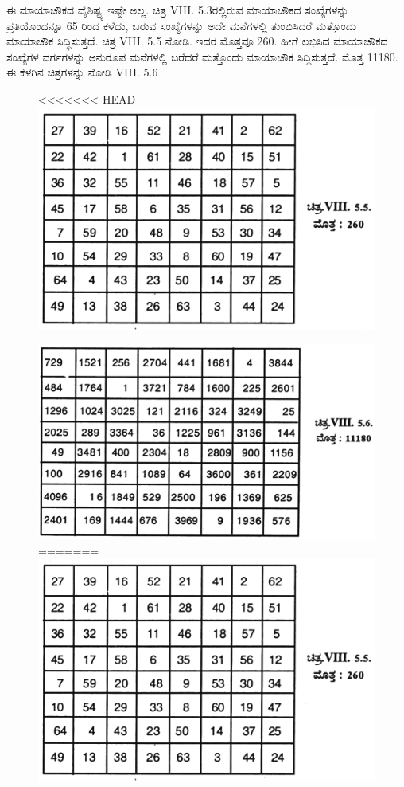 ಈ ಮಾಯಾಚೌಕದ ವೈಶಿಷ್ಟ್ಯ ಇಷ್ಟೇ ಅಲ್ಲ. ಚಿತ್ರ VIII. 5.3ರಲ್ಲಿರುವ ಮಾಯಾಚೌಕದ ಸಂಖ್ಯೆಗಳನ್ನು ಪ್ರತಿಯೊಂದನ್ನೂ 65 ರಿಂದ ಕಳೆದು, ಬರುವ ಸಂಖ್ಯೆಗಳನ್ನು ಅದೇ ಮನೆಗಳಲ್ಲಿ ತುಂಬಿಸಿದರೆ ಮತ್ತೊಂದು ಮಾಯಾಚೌಕ ಸಿದ್ಧಿಸುತ್ತದೆ. ಚಿತ್ರ VIII. 5.5 ನೋಡಿ. ಇದರ ಮೊತ್ತವೂ 260. ಹೀಗೆ ಲಭಿಸಿದ ಮಾಯಾಚೌಕದ ಸಂಖ್ಯೆಗಳ ವರ್ಗಗಳನ್ನು ಅನುರೂಪ ಮನೆಗಳಲ್ಲಿ ಬರೆದರೆ ಮತ್ತೊಂದು ಮಾಯಾಚೌಕ ಸಿದ್ಧಿಸುತ್ತದೆ. ಮೊತ್ತ 11180. ಈ ಕೆಳಗಿನ ಚಿತ್ರಗಳನ್ನು ನೋಡಿ VIII. 5.6
\begin{figure}[H]
<<<<<<< HEAD
\includegraphics{src/figures/chap7/fig7-19.jpg}
\end{figure}
\begin{figure}[H]
\includegraphics{src/figures/chap7/fig7-20.jpg}
=======
\includegraphics[scale=0.85]{src/figures/chap7/fig7.19.jpg}
\end{figure}
